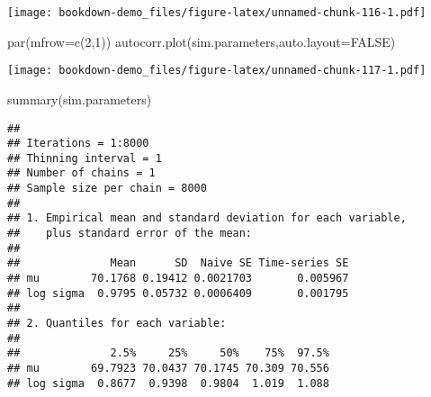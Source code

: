 \documentclass[
]{book}
\newenvironment{Shaded}{\begin{snugshade}}{\end{snugshade}}
\newcommand{\AttributeTok}[1]{\textcolor[rgb]{0.77,0.63,0.00}{#1}}
\newcommand{\ConstantTok}[1]{\textcolor[rgb]{0.00,0.00,0.00}{#1}}
\newcommand{\DecValTok}[1]{\textcolor[rgb]{0.00,0.00,0.81}{#1}}
\newcommand{\FunctionTok}[1]{\textcolor[rgb]{0.00,0.00,0.00}{#1}}
\newcommand{\NormalTok}[1]{#1}
\newcommand{\OtherTok}[1]{\textcolor[rgb]{0.56,0.35,0.01}{#1}}
\newcommand{\SpecialCharTok}[1]{\textcolor[rgb]{0.00,0.00,0.00}{#1}}
\newcommand{\StringTok}[1]{\textcolor[rgb]{0.31,0.60,0.02}{#1}}
\begin{document}
\begin{Shaded}
\end{Shaded}

\texttt{[image: bookdown-demo\_files/figure-latex/unnamed-chunk-116-1.pdf]}

\begin{Shaded}
\begin{Highlighting}[]
\FunctionTok{par}\NormalTok{(}\AttributeTok{mfrow=}\FunctionTok{c}\NormalTok{(}\DecValTok{2}\NormalTok{,}\DecValTok{1}\NormalTok{))}
 \FunctionTok{autocorr.plot}\NormalTok{(sim.parameters,}\AttributeTok{auto.layout=}\ConstantTok{FALSE}\NormalTok{)}
\end{Highlighting}
\end{Shaded}

\texttt{[image: bookdown-demo\_files/figure-latex/unnamed-chunk-117-1.pdf]}

\begin{Shaded}
\begin{Highlighting}[]
 \FunctionTok{summary}\NormalTok{(sim.parameters)}
\end{Highlighting}
\end{Shaded}

\begin{verbatim}
## 
## Iterations = 1:8000
## Thinning interval = 1 
## Number of chains = 1 
## Sample size per chain = 8000 
## 
## 1. Empirical mean and standard deviation for each variable,
##    plus standard error of the mean:
## 
##              Mean      SD  Naive SE Time-series SE
## mu        70.1768 0.19412 0.0021703       0.005967
## log sigma  0.9795 0.05732 0.0006409       0.001795
## 
## 2. Quantiles for each variable:
## 
##              2.5%     25%     50%    75%  97.5%
## mu        69.7923 70.0437 70.1745 70.309 70.556
## log sigma  0.8677  0.9398  0.9804  1.019  1.088
\end{verbatim}
\end{document}
